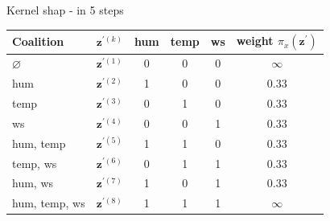 \documentclass[10pt,compress,t,notes=noshow, xcolor=table]{beamer}
\begin{document}
\begin{framev}[align=top]{Kernel shap - in 5 steps}
\begin{table}
\centering
\begin{tabular}{l |c|ccc|c}
Coalition & $\mathbf{z}^{\prime (k)}$ &  hum & temp & ws & weight $\pi_{x}\left(\mathbf{z}^{\prime}\right)$\\
\hline 
$\varnothing$ & $\mathbf{z}^{\prime (1)}$ & 0 & 0 & 0 & $\infty$ \\
hum & $\mathbf{z}^{\prime (2)}$ & 1 & 0 & 0 & 0.33 \\
temp &  $\mathbf{z}^{\prime (3)}$ & 0 & 1 & 0 & 0.33 \\
ws &   $\mathbf{z}^{\prime (4)}$ & 0 & 0 & 1 & 0.33  \\
hum, temp & $\mathbf{z}^{\prime (5)}$ & 1 & 1 & 0 & 0.33 \\
temp, ws & $\mathbf{z}^{\prime (6)}$ & 0 & 1 & 1 & 0.33 \\
hum, ws &   $\mathbf{z}^{\prime (7)}$ & 1 & 0 & 1 & 0.33 \\
hum, temp, ws & $\mathbf{z}^{\prime (8)}$ & 1 & 1 & 1 & $\infty$ \\
\end{tabular}
\end{table}
\end{framev}
\end{document}
